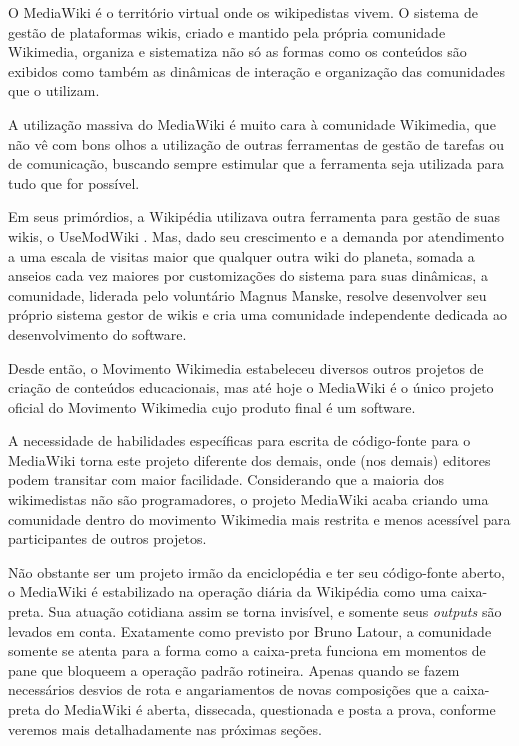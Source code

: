 O MediaWiki é o território virtual onde os wikipedistas vivem. O sistema de gestão de plataformas wikis, criado e mantido pela própria comunidade Wikimedia, organiza e sistematiza não só as formas como os conteúdos são exibidos como também as dinâmicas de interação e organização das comunidades que o utilizam.

A utilização massiva do MediaWiki é muito cara à comunidade Wikimedia, que não vê com bons olhos a utilização de outras ferramentas de gestão de tarefas ou de comunicação, buscando sempre estimular que a ferramenta seja utilizada para tudo que for possível.

Em seus primórdios, a Wikipédia utilizava outra ferramenta para gestão de suas wikis, o UseModWiki \citep{lih_wikirevolution_2009}. Mas, dado seu crescimento e a demanda por atendimento a uma escala de visitas maior que qualquer outra wiki do planeta, somada a anseios cada vez maiores por customizações do sistema para suas dinâmicas, a comunidade, liderada pelo voluntário Magnus Manske, resolve desenvolver seu próprio sistema gestor de wikis e cria uma comunidade independente dedicada ao desenvolvimento do software.

Desde então, o Movimento Wikimedia estabeleceu diversos outros projetos de criação de conteúdos educacionais, mas até hoje o MediaWiki é o único projeto oficial do Movimento Wikimedia cujo produto final é um software.

A necessidade de habilidades específicas para escrita de código-fonte para o MediaWiki torna este projeto diferente dos demais, onde (nos demais) editores podem transitar com maior facilidade. Considerando que a maioria dos wikimedistas não são programadores, o projeto  MediaWiki acaba criando uma comunidade dentro do movimento Wikimedia mais restrita e menos acessível para participantes de outros projetos.

Não obstante ser um projeto irmão da enciclopédia e ter seu código-fonte aberto, o MediaWiki é estabilizado na operação diária da Wikipédia como uma caixa-preta. Sua atuação cotidiana assim se torna invisível, e somente seus \textit{outputs} são levados em conta. Exatamente como previsto por Bruno Latour, a comunidade somente se atenta para a forma como a caixa-preta funciona em momentos de pane que bloqueem a operação padrão rotineira. Apenas quando se fazem necessários desvios de rota e angariamentos de novas composições que a caixa-preta do MediaWiki é aberta, dissecada, questionada e posta a prova, conforme veremos mais detalhadamente nas próximas seções.

